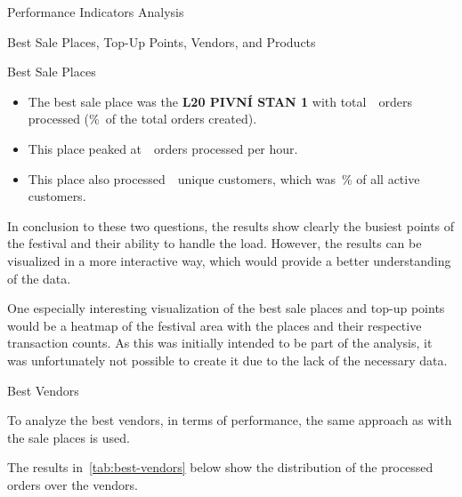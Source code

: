 \begin{section}{Performance Indicators Analysis}
\begin{subsection}{Best Sale Places, Top-Up Points, Vendors, and Products}
\begin{subsubsection}{Best Sale Places}
			\begin{keytakeaways}
				\begin{itemize}
					\item The best sale place was the \textbf{L20 PIVNÍ STAN 1} with total~~orders processed (\%~of the total orders created).
					\item This place peaked at~~orders processed per hour.
					\item This place also processed~~unique customers, which was~\% of all active customers.
				\end{itemize}
			\end{keytakeaways}

			In conclusion to these two questions, the results show clearly the busiest points of the festival and their ability to handle the load.
			However, the results can be visualized in a more interactive way, which would provide a better understanding of the data.

			One especially interesting visualization of the best sale places and top-up points would be a heatmap of the festival area with the places and their respective transaction counts.
			As this was initially intended to be part of the analysis, it was unfortunately not possible to create it due to the lack of the necessary data.
		\end{subsubsection}

		\begin{subsubsection}{Best Vendors}
			\label{subsubsec:analysis-best-vendors}

			To analyze the best vendors, in terms of performance, the same approach as with the sale places is used.


			The results in~\autoref{tab:best-vendors} below show the distribution of the processed orders over the vendors.


\end{subsubsection}
\end{subsection}
\end{section}
